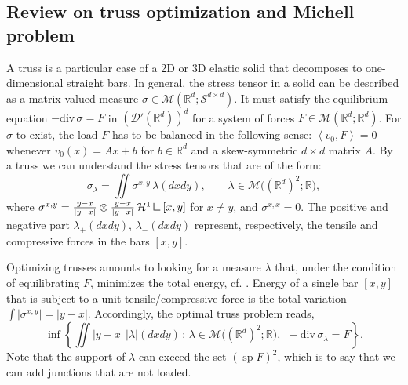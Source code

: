 \documentclass[11pt,letterpaper,reqno]{amsart}
\theoremstyle{definition}
\numberwithin{equation}{section}
\newcommand{\R}{\mathbb{R}}
\newcommand{\Rd}{\R^d}
\newcommand{\Mes}{{\mathcal{M}}}
\newcommand{\dive}{{\mathrm{div}}}
\newcommand{\pairing}[1]{{\left \langle #1 \right \rangle}}
\newcommand{\abs}[1]{{\left \lvert #1 \right \rvert}}
\newcommand{\D}{\mathcal{D}}
\newcommand{\Ha}{\mathcal{H}}
\newcommand{\Sdd}{{\mathcal{S}^{d \times d}}}
\newcommand{\mres}{\mathbin{\vrule height 1.6ex depth 0pt width
		0.13ex\vrule height 0.13ex depth 0pt width 1.3ex}}
\DeclareMathOperator{\spt}{sp}
\begin{document}
{\subsection{Review on truss optimization and Michell problem}
A truss is a particular case of a 2D or 3D elastic solid that decomposes to one-dimensional straight bars. In general, the stress tensor in a solid can be described as a matrix valued measure $\sigma \in \Mes(\Rd;\Sdd)$. It must satisfy the equilibrium equation $-\dive \, \sigma = F$ in  $(\D'(\Rd))^d$ for a system of forces $F \in \Mes(\Rd;\Rd)$. For $\sigma$ to exist, the load $F$ has to be balanced in the following sense: ${\pairing{v_0,F}} =0$ whenever $v_0(x) = Ax + b$ for $b \in \Rd$ and a skew-symmetric $d \times d$ matrix $A$. By a truss we can understand the stress tensors that are of the form:
\begin{equation}
	\label{eq:truss}
	\sigma_\lambda = \iint \sigma^{x,y}   \, \lambda(dxdy), \qquad \lambda \in \Mes\big((\Rd)^2;\R\big),
\end{equation}
where $\sigma^{x,y} = \frac{y-x}{|y-x|} \otimes  \frac{y-x}{|y-x|} \, \Ha^1 \mres [x,y]$ for $x \neq y$, and $\sigma^{x,x} =0$. The positive and negative part  $\lambda_+(dxdy)$, $\lambda_-(dxdy)$  represent, respectively, the tensile and compressive forces in the bars $[x,y]$. 

Optimizing trusses amounts to looking for a measure $\lambda$ that, under the condition of equilibrating $F$, minimizes the total energy, cf. \cite{bouchitte2008}. Energy of a single bar $[x,y]$  that is subject to a unit tensile/compressive force is the total variation $\int \abs{\sigma^{x,y}}=\abs{y-x}$. Accordingly, the optimal truss problem reads,
\begin{equation}
	\label{eq:optimal_truss}
	 \inf\left\{ \iint \abs{y-x} \, \abs{\lambda}(dxdy) \, : \, \lambda \in \Mes\big((\Rd)^2;\R\big)  , \ \ -\dive\, \sigma_\lambda = F  \right\}.
\end{equation}
Note that the support of $\lambda$ can exceed the set $(\spt F)^2$, which is to say that we can add junctions that are not loaded.

}
\end{document}
